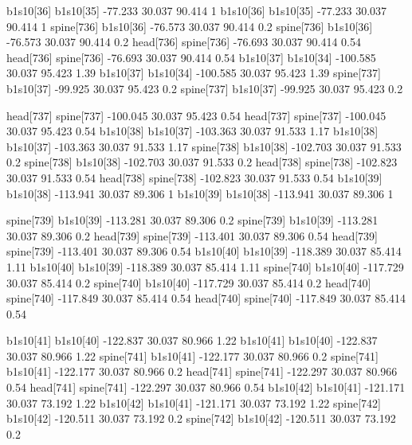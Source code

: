 b1s10[36]    b1s10[35]    -77.233    30.037    90.414    1
b1s10[36]    b1s10[35]    -77.233    30.037    90.414    1
spine[736]    b1s10[36]    -76.573    30.037    90.414    0.2
spine[736]    b1s10[36]    -76.573    30.037    90.414    0.2
head[736]    spine[736]    -76.693    30.037    90.414    0.54
head[736]    spine[736]    -76.693    30.037    90.414    0.54
b1s10[37]    b1s10[34]    -100.585    30.037    95.423    1.39
b1s10[37]    b1s10[34]    -100.585    30.037    95.423    1.39
spine[737]    b1s10[37]    -99.925    30.037    95.423    0.2
spine[737]    b1s10[37]    -99.925    30.037    95.423    0.2


head[737]    spine[737]    -100.045    30.037    95.423    0.54
head[737]    spine[737]    -100.045    30.037    95.423    0.54
b1s10[38]    b1s10[37]    -103.363    30.037    91.533    1.17
b1s10[38]    b1s10[37]    -103.363    30.037    91.533    1.17
spine[738]    b1s10[38]    -102.703    30.037    91.533    0.2
spine[738]    b1s10[38]    -102.703    30.037    91.533    0.2
head[738]    spine[738]    -102.823    30.037    91.533    0.54
head[738]    spine[738]    -102.823    30.037    91.533    0.54
b1s10[39]    b1s10[38]    -113.941    30.037    89.306    1
b1s10[39]    b1s10[38]    -113.941    30.037    89.306    1


spine[739]    b1s10[39]    -113.281    30.037    89.306    0.2
spine[739]    b1s10[39]    -113.281    30.037    89.306    0.2
head[739]    spine[739]    -113.401    30.037    89.306    0.54
head[739]    spine[739]    -113.401    30.037    89.306    0.54
b1s10[40]    b1s10[39]    -118.389    30.037    85.414    1.11
b1s10[40]    b1s10[39]    -118.389    30.037    85.414    1.11
spine[740]    b1s10[40]    -117.729    30.037    85.414    0.2
spine[740]    b1s10[40]    -117.729    30.037    85.414    0.2
head[740]    spine[740]    -117.849    30.037    85.414    0.54
head[740]    spine[740]    -117.849    30.037    85.414    0.54


b1s10[41]    b1s10[40]    -122.837    30.037    80.966    1.22
b1s10[41]    b1s10[40]    -122.837    30.037    80.966    1.22
spine[741]    b1s10[41]    -122.177    30.037    80.966    0.2
spine[741]    b1s10[41]    -122.177    30.037    80.966    0.2
head[741]    spine[741]    -122.297    30.037    80.966    0.54
head[741]    spine[741]    -122.297    30.037    80.966    0.54
b1s10[42]    b1s10[41]    -121.171    30.037    73.192    1.22
b1s10[42]    b1s10[41]    -121.171    30.037    73.192    1.22
spine[742]    b1s10[42]    -120.511    30.037    73.192    0.2
spine[742]    b1s10[42]    -120.511    30.037    73.192    0.2


